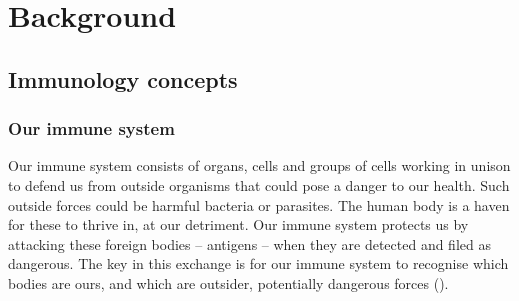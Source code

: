 
\chapter{Background}

\section{Immunology concepts}

\subsection{Our immune system} \label{bg:immunesystem}

Our immune system consists of organs, cells and groups of cells working in unison to defend us from outside organisms that could pose a danger to our health. Such outside forces could be harmful bacteria or parasites. The human body is a haven for these to thrive in, at our detriment. Our immune system protects us by attacking these foreign bodies – antigens – when they are detected and filed as dangerous. The key in this exchange is for our immune system to recognise which bodies are ours, and which are outsider, potentially dangerous forces (\cite{http://www.imgt.org/IMGTeducation/Tutorials/ImmuneSystem/UK/the_immune_system.pdf}).

